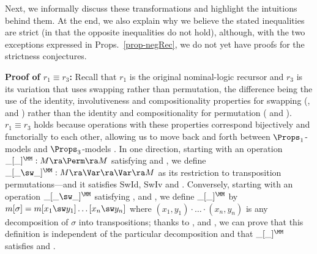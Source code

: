 	Next, we informally discuss these transformations and highlight the intuitions behind them. %
	At the end, we also explain why we believe the stated inequalities are strict (in that the opposite inequalities do not hold), although, with the two exceptions expressed in Props.~\ref{prop-negRec}, 
	we do not yet have  
	proofs 
	 for the strictness  conjectures.  
	
	\textbf{Proof of $r_1 \equiv r_3$:} Recall that $r_1$ is the original nominal-logic recursor and $r_3$ is its variation that uses swapping rather than permutation, the difference being the use of 
	the identity, involutiveness and compositionality properties for swapping (\SwId{}, \SwIv{} and \SwCp{}) rather than the identity and compositionality for permutation (\PmId{} and \PmCp{}). $r_1 \equiv r_3$ holds because  operations with these  properties correspond bijectively and functorially to each other, allowing us to move back and forth between $\Props_1$-models and $\Props_3$-models \cite[Section 6.1]{pitts_2013}. In one direction, starting with an operation $\_[\_]^\MM : M \ra \Perm \ra M$ satisfying \PmId{} and \PmCp{}, we define $\_[\_\sw\_]^\MM : M \ra \Var \ra \Var \ra M$ as its restriction to transposition permutations---and it satisfies SwId, SwIv and 
	\SwCp{}. Conversely, starting with an operation $\_[\_\sw\_]^\MM$ satisfying \SwId{}, \SwIv{} and \SwCp{}, we define $\_[\_]^\MM$ by $m[\sigma] = m[x_1\sw y_1]\ldots[x_n\sw y_n]$ where $(x_1,y_1) \cdot \ldots \cdot (x_n,y_n)$ is any decomposition of $\sigma$ into transpositions; thanks to \SwId{}, \SwIv{} and \SwCp{}, we can prove that this definition is independent of the particular decomposition and that $\_[\_]^\MM$ satisfies \PmId{} and \PmCp{}. 
	
